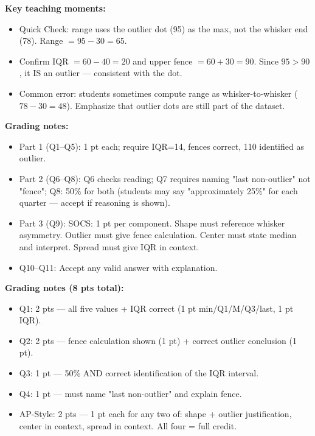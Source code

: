 \documentclass[10pt]{article}
\begin{document}
\boxguard
\begin{teachernote}
\textbf{Key teaching moments:}
\begin{itemize}[itemsep=2pt]
  \item Quick Check: range uses the outlier dot (95) as the max, not the whisker end (78). Range $= 95 - 30 = 65$.
  \item Confirm IQR $= 60 - 40 = 20$ and upper fence $= 60 + 30 = 90$. Since $95 > 90$, it IS an outlier — consistent with the dot.
  \item Common error: students sometimes compute range as whisker-to-whisker ($78 - 30 = 48$). Emphasize that outlier dots are still part of the dataset.
\end{itemize}
\end{teachernote}

\boxguard
\begin{teachernote}
\textbf{Grading notes:}
\begin{itemize}[itemsep=2pt]
  \item Part 1 (Q1--Q5): 1 pt each; require IQR=14, fences correct, 110 identified as outlier.
  \item Part 2 (Q6--Q8): Q6 checks reading; Q7 requires naming "last non-outlier" not "fence"; Q8: 50\% for both (students may say "approximately 25\%" for each quarter — accept if reasoning is shown).
  \item Part 3 (Q9): SOCS: 1 pt per component. Shape must reference whisker asymmetry. Outlier must give fence calculation. Center must state median and interpret. Spread must give IQR in context.
  \item Q10--Q11: Accept any valid answer with explanation.
\end{itemize}
\end{teachernote}

\boxguard
\begin{teachernote}
\textbf{Grading notes (8 pts total):}
\begin{itemize}[itemsep=2pt]
  \item Q1: 2 pts — all five values + IQR correct (1 pt min/Q1/M/Q3/last, 1 pt IQR).
  \item Q2: 2 pts — fence calculation shown (1 pt) + correct outlier conclusion (1 pt).
  \item Q3: 1 pt — 50\% AND correct identification of the IQR interval.
  \item Q4: 1 pt — must name "last non-outlier" and explain fence.
  \item AP-Style: 2 pts — 1 pt each for any two of: shape + outlier justification, center in context, spread in context. All four = full credit.
\end{itemize}
\end{teachernote}
\end{document}

